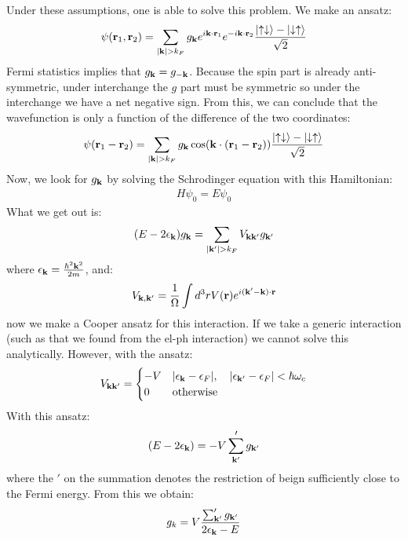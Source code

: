 Under these assumptions, one is able to solve this problem. We make an ansatz:
\begin{equation}
    \psi(\mathbf{r}_1, \mathbf{r}_2) = \sum_{\lvert \mathbf{k} \rvert > k_F}g_{\mathbf{k}} e^{i\mathbf{k} \cdot \mathbf{r}_1}e^{-i\mathbf{k} \cdot \mathbf{r}_2}\frac{\lvert \uparrow\downarrow \rangle - \lvert \downarrow\uparrow \rangle}{\sqrt{2}}
\end{equation}
Fermi statistics implies that $g_{\mathbf{k}} = g_{-\mathbf{k}}$. Because the spin part is already anti-symmetric, under interchange the $g$ part must be symmetric so under the interchange we have a net negative sign. From this, we can conclude that the wavefunction is only a function of the difference of the two coordinates:
\begin{align*}
    \psi(\mathbf{r}_1 - \mathbf{r}_2) = \sum_{\lvert \mathbf{k} \rvert > k_F}g_{\mathbf{k}}\cos(\mathbf{k} \cdot (\mathbf{r}_1 - \mathbf{r}_2)) \frac{\lvert \uparrow\downarrow \rangle - \lvert \downarrow\uparrow \rangle}{\sqrt{2}}
\end{align*}
Now, we look for $g_{\mathbf{k}}$ by solving the Schrodinger equation with this Hamiltonian:
\begin{align*}
    H\psi_0 = E\psi_0
\end{align*}
What we get out is:
\begin{equation}
    (E - 2\epsilon_{\mathbf{k}})g_{\mathbf{k}} = \sum_{\lvert \mathbf{k}' \rvert > k_F}V_{\mathbf{k}\mathbf{k}'}g_{\mathbf{k}'}
\end{equation}
where $\epsilon_{\mathbf{k}} = \frac{\hbar^2\mathbf{k}^2}{2m}$, and:
\begin{equation}
    V_{\mathbf{k}, \mathbf{k}'} = \frac{1}{\Omega}\int d^3r V(\mathbf{r})e^{i(\mathbf{k}' - \mathbf{k}) \cdot \mathbf{r}}
\end{equation}
now we make a Cooper ansatz for this interaction. If we take a generic interaction (such as that  we found from the el-ph interaction) we cannot solve this analytically. However, with the ansatz:
\begin{equation}
    V_{\mathbf{k}\mathbf{k}'} = \begin{cases}
        -V & \lvert \epsilon_{\mathbf{k}} - \epsilon_F \rvert, \quad \lvert \epsilon_{\mathbf{k}'} - \epsilon_F  \rvert < \hbar \omega_c
        \\ 0 & \text{otherwise}
    \end{cases}
\end{equation}
With this ansatz:
\begin{align*}
    (E - 2\epsilon_{\mathbf{k}}) = -V\sum_{\mathbf{k}'}'g_{\mathbf{k}'}
\end{align*}
where the $'$ on the summation denotes the restriction of beign sufficiently close to the Fermi energy. From this we obtain:
\begin{align*}
    g_k = V\frac{\sum_{\mathbf{k}'}' g_{\mathbf{k}'}}{2\epsilon_{\mathbf{k}} - E}
\end{align*}
